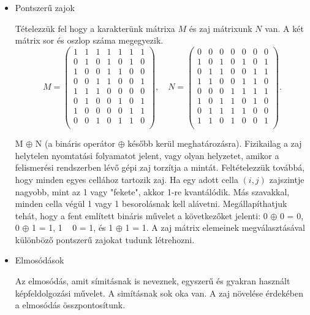 \begin{itemize}
\item Pontszerű zajok

Tételezzük fel hogy a karakterünk mátrixa $M$ és zaj mátrixunk $N$ van. A két mátrix sor és oszlop száma megegyezik.
$$
M = \left(
\begin{array}{ccccccc}
1 & 1 & 1 & 1 & 1 & 1 & 1 \\
0 & 1 & 0 & 1 & 0 & 1 & 0 \\
1 & 0 & 0 & 1 & 1 & 0 & 0 \\
0 & 0 & 1 & 1 & 0 & 0 & 1 \\
1 & 1 & 1 & 0 & 0 & 0 & 0 \\
0 & 1 & 0 & 0 & 1 & 0 & 1 \\
1 & 0 & 0 & 0 & 0 & 1 & 1 \\
0 & 0 & 1 & 0 & 1 & 1 & 0 \\
\end{array}
\right),
\quad
N = \left(
\begin{array}{ccccccc}
0 & 0 & 0 & 0 & 0 & 0 & 0 \\
1 & 0 & 1 & 0 & 1 & 0 & 1 \\
0 & 1 & 1 & 0 & 0 & 1 & 1 \\
1 & 1 & 0 & 0 & 1 & 1 & 0 \\
0 & 0 & 0 & 1 & 1 & 1 & 1 \\
1 & 0 & 1 & 1 & 0 & 1 & 0 \\
0 & 1 & 1 & 1 & 1 & 0 & 0 \\
1 & 1 & 0 & 1 & 0 & 0 & 1 \\
\end{array}
\right).
$$

M $\oplus$ N (a bináris operátor $\oplus$ később kerül meghatározásra). Fizikailag a zaj helytelen nyomtatási folyamatot jelent, vagy olyan helyzetet, amikor a felismerési rendszerben lévő gépi zaj torzítja a mintát. Feltételezzük továbbá, hogy minden egyes cellához tartozik zaj.
Ha egy adott cella $(i, j)$ zajszintje nagyobb, mint az 1 vagy "fekete", akkor 1-re kvantálódik. Más szavakkal, minden cella végül 1 vagy 1 besorolásnak kell alávetni. Megállapíthatjuk tehát, hogy a fent említett bináris művelet a következőket jelenti: 0 $\oplus$ 0 = 0, 0 $\oplus$ 1 = 1, 1 ~ 0 = 1, és 1 $\oplus$ 1 = 1.
A zaj mátrix elemeinek megválasztásával különböző pontszerű zajokat tudunk létrehozni.

\item Elmosódások

Az elmosódás, amit símitásnak is neveznek, egyszerű és gyakran használt képfeldolgozási művelet. A simításnak sok oka van. A zaj növelése érdekében a elmosódás összpontosítunk.


\end{itemize}

